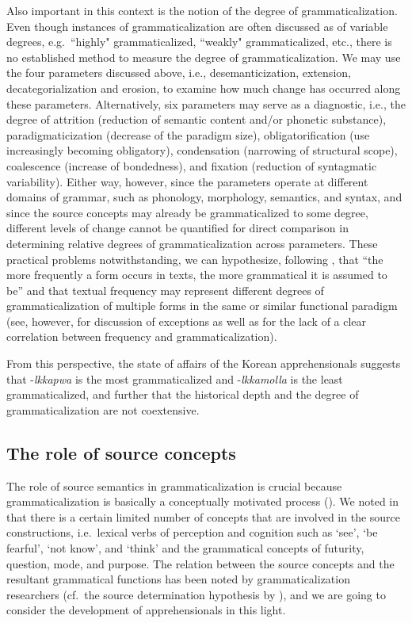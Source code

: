 \documentclass[output=paper,colorlinks,citecolor=brown]{langscibook}
\begin{document}
Also important in this context is the notion of the degree of grammaticalization. Even though instances of grammaticalization are often discussed as of variable degrees, e.g.\  ``highly" grammaticalized, ``weakly" grammaticalized, etc., there is no established method to measure the degree of grammaticalization. We may use the four parameters discussed above, i.e., desemanticization, extension, decategorialization and erosion, to examine how much change has occurred along these parameters. Alternatively,  six parameters may serve as a diagnostic, i.e., the degree of attrition (reduction of semantic content and/or phonetic substance), paradigmaticization (decrease of the paradigm size), obligatorification (use increasingly becoming obligatory), condensation (narrowing of structural scope), coalescence (increase of bondedness), and fixation (reduction of syntagmatic variability). Either way, however, since the parameters operate at different domains of grammar, such as phonology, morphology, semantics, and syntax, and since the source concepts may already be grammaticalized to some degree, different levels of change cannot be quantified for direct comparison in determining relative degrees of grammaticalization across parameters. These practical problems notwithstanding, we can hypothesize, following \citet[106]{HopperTraugott2003}, that ``the more frequently a form occurs in texts, the more grammatical it is assumed to be'' and that textual frequency may represent different degrees of grammaticalization of multiple forms in the same or similar functional paradigm (see, however, \citealt{Heine1992} for discussion of exceptions as well as \citealt[38--39]{HeineKuteva2007} for the lack of a clear correlation between frequency and grammaticalization).

From this perspective, the state of affairs of the Korean apprehensionals suggests that \nobreakdash-\textit{lkkapwa} is the most grammaticalized and \nobreakdash-\textit{lkkamolla} is the least grammaticalized, and further that the historical depth and the degree of grammaticalization are not coextensive.



\subsection{The role of source concepts}
\label{subsec:sourceconcepts}

The role of source semantics in grammaticalization is crucial because grammaticalization is basically a conceptually motivated process (\citealt{Heine1986,Heine1997,HeineClaudi1986,HeineEtAl1991,Kuteva2001}). We noted in  that there is a certain limited number of concepts that are involved in the source constructions, i.e.\  lexical verbs of perception and cognition such as `see', `be fearful', `not know', and `think' and the grammatical concepts of futurity, question, mode, and purpose. The relation between the source concepts and the resultant grammatical functions has been noted by grammaticalization researchers (cf.\ the source determination hypothesis by \citet{bybeeetal1994}), and we are going to consider the development of apprehensionals in this light.
\end{document}
